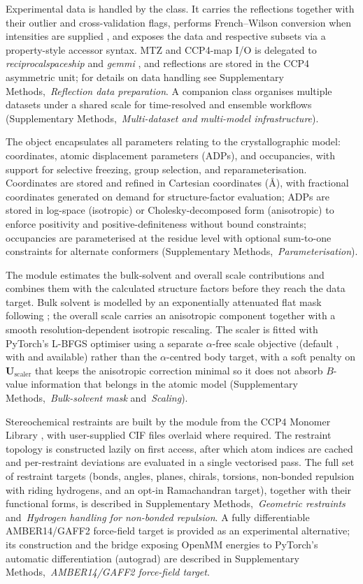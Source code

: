 \documentclass{iucrjournals}
\newcommand{\suppref}[1]{Supplementary Methods,~\emph{#1}}
\newcommand{\suppparen}[1]{(\suppref{#1})}
\newcommand{\supprefii}[2]{Supplementary Methods,~\emph{#1} and~\emph{#2}}
\newcommand{\suppparenii}[2]{(\supprefii{#1}{#2})}
\begin{document}
Experimental data is handled by the  class.
It carries the reflections together with their outlier and cross-validation
flags, performs French--Wilson conversion when intensities are supplied
\cite{french_treatment_1978}, and exposes the data and respective subsets via a property-style accessor syntax.
MTZ and CCP4-map I/O is delegated to \emph{reciprocalspaceship} and
\emph{gemmi} \cite{greisman_reciprocalspaceship_2021,wojdyr_gemmi_2022},
and reflections are stored in the CCP4 asymmetric unit; for details on data
handling see \suppref{Reflection data preparation}.
A companion  class organises multiple datasets
under a shared scale for time-resolved and ensemble workflows
\suppparen{Multi-dataset and multi-model infrastructure}.

The  object encapsulates all parameters relating to the
crystallographic model: coordinates, atomic displacement parameters
(ADPs), and occupancies, with support for selective freezing, group
selection, and reparameterisation.
Coordinates are stored and refined in Cartesian coordinates (\AA), with
fractional coordinates generated on demand for structure-factor evaluation;
ADPs are stored in
log-space (isotropic) or Cholesky-decomposed form (anisotropic) to enforce
positivity and positive-definiteness without bound constraints; occupancies
are parameterised at the residue level with optional sum-to-one constraints
for alternate conformers \suppparen{Parameterisation}.

The  module estimates the bulk-solvent and overall scale
contributions and combines them with the calculated structure factors
before they reach the data target.
Bulk solvent is modelled by an exponentially attenuated flat mask following
\cite{afonine_robust_2005}; the overall scale carries an anisotropic
component together with a smooth resolution-dependent isotropic rescaling.
The scaler is fitted with PyTorch's L-BFGS optimiser using a separate
$\alpha$-free scale objective (default , with  and 
available) rather than the $\alpha$-centred body target, with a soft penalty on
$\mathbf{U}_\mathrm{scaler}$ that keeps the anisotropic correction minimal so it
does not absorb $B$-value information that belongs in the atomic model
\suppparenii{Bulk-solvent mask}{Scaling}.

Stereochemical restraints are built by the  module from the
CCP4 Monomer Library \cite{long_acedrg_2017}, with user-supplied CIF files
overlaid where required.
The restraint topology is constructed lazily on first access, after which
atom indices are cached and per-restraint deviations are evaluated in a
single vectorised pass.
The full set of restraint targets (bonds, angles, planes, chirals, torsions,
non-bonded repulsion with riding hydrogens, and an opt-in Ramachandran
target), together with their functional forms, is described in
\supprefii{Geometric restraints}{Hydrogen handling for non-bonded repulsion}.
A fully differentiable AMBER14/GAFF2 force-field target is provided as an
experimental alternative; its construction and the bridge exposing OpenMM
energies to PyTorch's automatic differentiation (autograd)
are described in \suppref{AMBER14/GAFF2 force-field target}.
\end{document}
